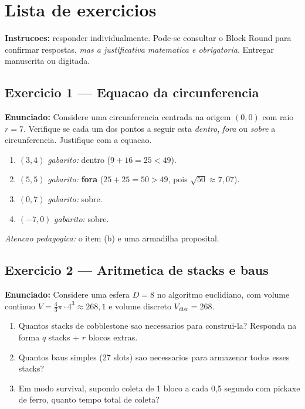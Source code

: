 \documentclass[12pt,a4paper]{scrartcl}
\newcommand{\acc}[1]{\textcolor{accent}{\textbf{#1}}}
\begin{document}
\newpage
\section{Lista de exercicios}\label{ap:exerc}

\textbf{Instrucoes:} responder individualmente. Pode-se consultar o Block Round para confirmar respostas, \emph{mas a justificativa matematica e obrigatoria}. Entregar manuscrita ou digitada.

\subsection*{Exercicio 1 --- Equacao da circunferencia}
\textbf{Enunciado:} Considere uma circunferencia centrada na origem $(0, 0)$ com raio $r = 7$. Verifique se cada um dos pontos a seguir esta \emph{dentro}, \emph{fora} ou \emph{sobre} a circunferencia. Justifique com a equacao.
\begin{enumerate}[label=\alph*),leftmargin=1.5em,itemsep=0.1em,topsep=0.2em,nosep]
  \item $(3, 4)$ \hfill \emph{gabarito:} dentro ($9 + 16 = 25 < 49$).
  \item $(5, 5)$ \hfill \emph{gabarito:} \acc{fora} ($25 + 25 = 50 > 49$, pois $\sqrt{50} \approx 7{,}07$).
  \item $(0, 7)$ \hfill \emph{gabarito:} sobre.
  \item $(-7, 0)$ \hfill \emph{gabarito:} sobre.
\end{enumerate}

\textit{Atencao pedagogica:} o item (b) e uma armadilha proposital.

\subsection*{Exercicio 2 --- Aritmetica de stacks e baus}
\textbf{Enunciado:} Considere uma esfera $D = 8$ no algoritmo euclidiano, com volume continuo $V = \tfrac{4}{3}\pi \cdot 4^3 \approx 268{,}1$ e volume discreto $V_{\mathrm{disc}} = 268$.
\begin{enumerate}[label=\alph*),leftmargin=1.5em,itemsep=0.1em,topsep=0.2em,nosep]
  \item Quantos stacks de cobblestone sao necessarios para construi-la? Responda na forma $q$ stacks $+$ $r$ blocos extras.
  \item Quantos baus simples (27 slots) sao necessarios para armazenar todos esses stacks?
  \item Em modo survival, supondo coleta de 1 bloco a cada 0{,}5 segundo com pickaxe de ferro, quanto tempo total de coleta?
\end{enumerate}
\end{document}
